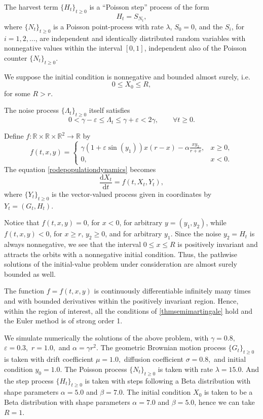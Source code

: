 \documentclass[reqno,12pt]{amsart}
\theoremstyle{plain} %
\theoremstyle{definition} %
\begin{document}
The harvest term $\{H_t\}_{t\geq 0}$ is a ``Poisson step'' process of the form
\[
    H_t = S_{N_t},
\]
where $\{N_t\}_{t\geq 0}$ is a Poisson point-process with rate $\lambda$, $S_0 = 0$, and the $S_i$, for $i=1, 2, \ldots$, are independent and identically distributed random variables with nonnegative values within the interval $[0, 1]$, independent also of the Poisson counter $\{N_t\}_{t\geq 0}$.

We suppose the initial condition is nonnegative and bounded almost surely, i.e.
\[
    0 \leq X_0 \leq R,
\]
for some $R > r$.

The noise process $\{\Lambda_t\}_{t \geq 0}$ itself satisfies
\[
    0 < \gamma - \varepsilon \leq \Lambda_t \leq \gamma + \varepsilon < 2\gamma, \qquad \forall t \geq 0.
\]

Define $f:\mathbb{R} \times \mathbb{R} \times \mathbb{R}^2 \rightarrow \mathbb{R}$ by
\[
    f(t, x, y) = \begin{cases}
        \displaystyle \gamma (1 + \varepsilon \sin(y_1)) x(r - x) - \alpha \frac{xy_2}{r + x}, & x \geq 0, \\
        0, & x < 0.
    \end{cases}
\]
The equation \cref{rodepopulationdynamics} becomes
\[
    \frac{\mathrm{d}X_t}{\mathrm{d}t} = f(t, X_t, Y_t),
\]
where $\{Y_t\}_{t\geq 0}$ is the vector-valued process given in coordinates by $Y_t = (G_t, H_t)$.

Notice that $f(t, x, y) = 0$, for $x < 0$, for arbitrary $y=(y_1, y_2)$, while $f(t, x, y) < 0$, for $x \geq r$, $y_2 \geq 0$, and for arbitrary $y_1$. Since the noise $y_2 = H_t$ is always nonnegative, we see that the interval $0 \leq x \leq R$ is positively invariant and attracts the orbits with a nonnegative initial condition. Thus, the pathwise solutions of the initial-value problem under consideration are almost surely bounded as well.

The function $f=f(t, x, y)$ is continuously differentiable infinitely many times and with bounded derivatives within the positively invariant region. Hence, within the region of interest, all the conditions of \cref{thmsemimartingale} hold and the Euler method is of strong order 1.

We simulate numerically the solutions of the above problem, with $\gamma = 0.8,$ $\varepsilon = 0.3,$ $r = 1.0,$ and $\alpha = \gamma r^2.$ The geometric Brownian motion process $\{G_t\}_{t\geq 0}$ is taken with drift coefficient $\mu = 1.0,$ diffusion coefficient $\sigma = 0.8,$ and initial condition $y_0 = 1.0.$ The Poisson process $\{N_t\}_{t \geq 0}$ is taken with rate $\lambda = 15.0$. And the step process $\{H_t\}_{t \geq 0}$ is taken with steps following a Beta distribution with shape parameters $\alpha = 5.0$ and $\beta = 7.0$. The initial condition $X_0$ is taken to be a Beta distribution with shape parameters $\alpha = 7.0$ and $\beta = 5.0$, hence we can take $R = 1$.
\end{document}
